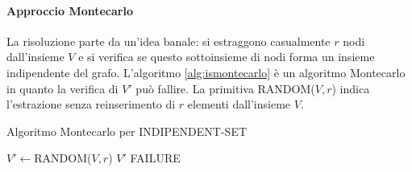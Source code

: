 \paragraph*{Approccio Montecarlo}
La risoluzione parte da un'idea banale: si estraggono casualmente $r$ nodi dall'insieme $V$ e si verifica se questo sottoinsieme di nodi forma un insieme indipendente del grafo. L'algoritmo \ref{alg:ismontecarlo} è un algoritmo Montecarlo in quanto la verifica di $V'$ può fallire. La primitiva RANDOM($V,r$) indica l'estrazione senza reinserimento di $r$ elementi dall'insieme $V$.

\begin{algorithm}
\caption{Algoritmo Montecarlo per INDIPENDENT-SET}
\label{alg:ismontecarlo}
\begin{algorithmic}
	\State $V'\gets$RANDOM($V,r$)
		\State \Return $V'$
	\Else
		\State \Return FAILURE
	\EndIf
\EndFunction
\end{algorithmic}
\end{algorithm}

